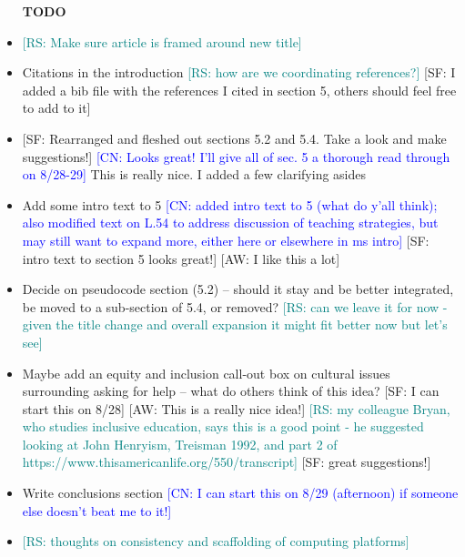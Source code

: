 \newcommand{\aw}[1]{{\textcolor{armygreen}{[AW: #1]}}} %
\newcommand{\sarah}[1]{{\textcolor{amethyst}{[SF: #1]}}} %
\newcommand{\rs}[1]{{\textcolor{teal}{[RS: #1]}}} %
\newcommand{\jo}[1]{{\textcolor{pauburn}{[JO: #1]}}} %
\newcommand{\cn}[1]{{\textcolor{blue}{[CN: #1]}}} %

\begin{itemize}
\item [\textbf{TODO}]
    \item \rs{Make sure article is framed around new title}
    \item Citations in the introduction \rs{how are we coordinating references?} \sarah{I added a bib file with the references I cited in section 5, others should feel free to add to it}
    \item \sarah{Rearranged and fleshed out sections 5.2 and 5.4. Take a look and make suggestions!} \cn{Looks great! I'll give all of sec. 5 a thorough read through on 8/28-29} {This is really nice. I added a few clarifying asides}
    \item Add some intro text to 5 \cn{added intro text to 5 (what do y'all think); also modified text on L.54 to address discussion of teaching strategies, but may still want to expand more, either here or elsewhere in ms intro} \sarah{intro text to section 5 looks great!} \aw{I like this a lot}
    \item Decide on pseudocode section (5.2) -- should it stay and be better integrated, be moved to a sub-section of 5.4, or removed? \rs{can we leave it for now - given the title change and overall expansion it might fit better now but let's see}
    \item Maybe add an equity and inclusion call-out box on cultural issues surrounding asking for help -- what do others think of this idea? \sarah{I can start this on 8/28} \aw{This is a really nice idea!} \rs{my colleague Bryan, who studies inclusive education, says this is a good point - he suggested looking at John Henryism, Treisman 1992, and part 2 of https://www.thisamericanlife.org/550/transcript} \sarah{great suggestions!}
    \item Write conclusions section \cn{I can start this on 8/29 (afternoon) if someone else doesn't beat me to it!}
    \item \rs{thoughts on consistency and scaffolding of computing platforms}
\end{itemize}


